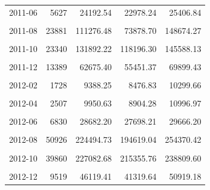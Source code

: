 \begin{longtable}[t]{crrrr}
2011-06 & 5627 & 24192.54 & 22978.24 & 25406.84\\
\cellcolor{gray!10}{2011-07} & \cellcolor{gray!10}{9768} & \cellcolor{gray!10}{48913.42} & \cellcolor{gray!10}{35610.92} & \cellcolor{gray!10}{62215.91}\\
2011-08 & 23881 & 111276.48 & 73878.70 & 148674.27\\
\cellcolor{gray!10}{2011-09} & \cellcolor{gray!10}{55031} & \cellcolor{gray!10}{277062.79} & \cellcolor{gray!10}{263946.91} & \cellcolor{gray!10}{290178.67}\\
2011-10 & 23340 & 131892.22 & 118196.30 & 145588.13\\
\cellcolor{gray!10}{2011-11} & \cellcolor{gray!10}{18541} & \cellcolor{gray!10}{88810.90} & \cellcolor{gray!10}{79280.55} & \cellcolor{gray!10}{98341.26}\\
2011-12 & 13389 & 62675.40 & 55451.37 & 69899.43\\
\cellcolor{gray!10}{2012-01} & \cellcolor{gray!10}{2978} & \cellcolor{gray!10}{16011.87} & \cellcolor{gray!10}{13650.91} & \cellcolor{gray!10}{18372.83}\\
2012-02 & 1728 & 9388.25 & 8476.83 & 10299.66\\
\cellcolor{gray!10}{2012-03} & \cellcolor{gray!10}{2509} & \cellcolor{gray!10}{10495.01} & \cellcolor{gray!10}{9324.13} & \cellcolor{gray!10}{11665.89}\\
2012-04 & 2507 & 9950.63 & 8904.28 & 10996.97\\
\cellcolor{gray!10}{2012-05} & \cellcolor{gray!10}{3987} & \cellcolor{gray!10}{16129.98} & \cellcolor{gray!10}{15089.50} & \cellcolor{gray!10}{17170.47}\\
2012-06 & 6830 & 28682.20 & 27698.21 & 29666.20\\
\cellcolor{gray!10}{2012-07} & \cellcolor{gray!10}{14868} & \cellcolor{gray!10}{58160.92} & \cellcolor{gray!10}{49189.76} & \cellcolor{gray!10}{67132.08}\\
2012-08 & 50926 & 224494.73 & 194619.04 & 254370.42\\
\cellcolor{gray!10}{2012-09} & \cellcolor{gray!10}{63408} & \cellcolor{gray!10}{313694.66} & \cellcolor{gray!10}{298086.28} & \cellcolor{gray!10}{329303.03}\\
2012-10 & 39860 & 227082.68 & 215355.76 & 238809.60\\
\cellcolor{gray!10}{2012-11} & \cellcolor{gray!10}{18114} & \cellcolor{gray!10}{86882.65} & \cellcolor{gray!10}{77320.04} & \cellcolor{gray!10}{96445.27}\\
2012-12 & 9519 & 46119.41 & 41319.64 & 50919.18\\

\end{longtable}
